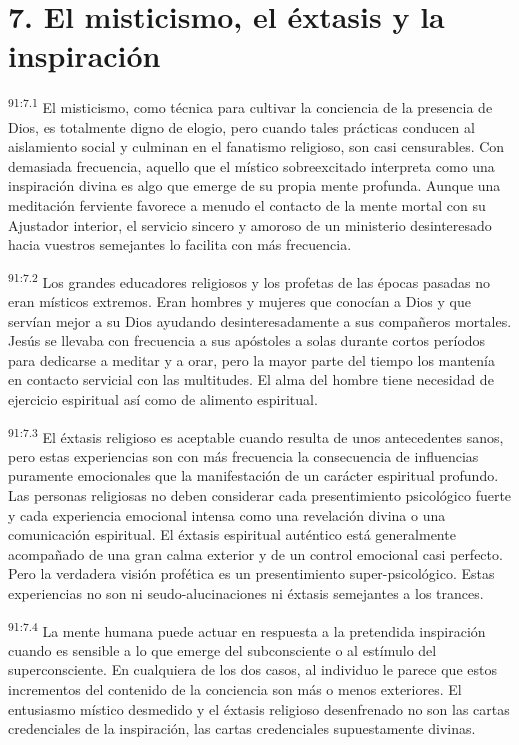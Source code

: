 \section*{7. El misticismo, el éxtasis y la inspiración}
\par
\textsuperscript{91:7.1} El misticismo, como técnica para cultivar la conciencia de la presencia de Dios, es totalmente digno de elogio, pero cuando tales prácticas conducen al aislamiento social y culminan en el fanatismo religioso, son casi censurables. Con demasiada frecuencia, aquello que el místico sobreexcitado interpreta como una inspiración divina es algo que emerge de su propia mente profunda. Aunque una meditación ferviente favorece a menudo el contacto de la mente mortal con su Ajustador interior, el servicio sincero y amoroso de un ministerio desinteresado hacia vuestros semejantes lo facilita con más frecuencia.

\par
\textsuperscript{91:7.2} Los grandes educadores religiosos y los profetas de las épocas pasadas no eran místicos extremos. Eran hombres y mujeres que conocían a Dios y que servían mejor a su Dios ayudando desinteresadamente a sus compañeros mortales. Jesús se llevaba con frecuencia a sus apóstoles a solas durante cortos períodos para dedicarse a meditar y a orar, pero la mayor parte del tiempo los mantenía en contacto servicial con las multitudes. El alma del hombre tiene necesidad de ejercicio espiritual así como de alimento espiritual.

\par
\textsuperscript{91:7.3} El éxtasis religioso es aceptable cuando resulta de unos antecedentes sanos, pero estas experiencias son con más frecuencia la consecuencia de influencias puramente emocionales que la manifestación de un carácter espiritual profundo. Las personas religiosas no deben considerar cada presentimiento psicológico fuerte y cada experiencia emocional intensa como una revelación divina o una comunicación espiritual. El éxtasis espiritual auténtico está generalmente acompañado de una gran calma exterior y de un control emocional casi perfecto. Pero la verdadera visión profética es un presentimiento super-psicológico. Estas experiencias no son ni seudo-alucinaciones ni éxtasis semejantes a los trances.

\par
\textsuperscript{91:7.4} La mente humana puede actuar en respuesta a la pretendida inspiración cuando es sensible a lo que emerge del subconsciente o al estímulo del superconsciente. En cualquiera de los dos casos, al individuo le parece que estos incrementos del contenido de la conciencia son más o menos exteriores. El entusiasmo místico desmedido y el éxtasis religioso desenfrenado no son las cartas credenciales de la inspiración, las cartas credenciales supuestamente divinas.

